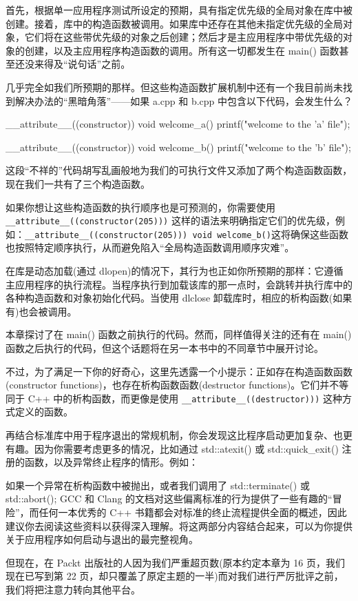 
首先，根据单一应用程序测试所设定的预期，具有指定优先级的全局对象在库中被创建。接着，库中的构造函数被调用。如果库中还存在其他未指定优先级的全局对象，它们将在这些带优先级的对象之后创建；然后才是主应用程序中带优先级的对象的创建，以及主应用程序构造函数的调用。所有这一切都发生在 main() 函数甚至还没来得及“说句话”之前。

几乎完全如我们所预期的那样。但这些构造函数扩展机制中还有一个我目前尚未找到解决办法的“黑暗角落”——如果 a.cpp 和 b.cpp 中包含以下代码，会发生什么？

\begin{cpp}
__attribute__((constructor)) void welcome_a() {
  printf("welcome to the 'a' file\n"); 
}

__attribute__((constructor)) void welcome_b() {
  printf("welcome to the 'b' file\n"); 
}
\end{cpp}

这段“不祥的”代码胡写乱画般地为我们的可执行文件又添加了两个构造函数函数，现在我们一共有了三个构造函数。

如果你想让这些构造函数的执行顺序也是可预测的，你需要使用 \verb|__attribute__((constructor(205)))| 这样的语法来明确指定它们的优先级，例如：\verb|__attribute__((constructor(205))) void welcome_b()|这将确保这些函数也按照特定顺序执行，从而避免陷入“全局构造函数调用顺序灾难”。

在库是动态加载(通过 dlopen)的情况下，其行为也正如你所预期的那样：它遵循主应用程序的执行流程。当程序执行到加载该库的那一点时，会跳转并执行库中的各种构造函数和对象初始化代码。当使用 dlclose 卸载库时，相应的析构函数(如果有)也会被调用。


本章探讨了在 main() 函数之前执行的代码。然而，同样值得关注的还有在 main() 函数之后执行的代码，但这个话题将在另一本书中的不同章节中展开讨论。

不过，为了满足一下你的好奇心，这里先透露一个小提示：正如存在构造函数函数(constructor functions)，也存在析构函数函数(destructor functions)。它们并不等同于 C++ 中的析构函数，而更像是使用 \verb|__attribute__((destructor)))| 这种方式定义的函数。

再结合标准库中用于程序退出的常规机制，你会发现这比程序启动更加复杂、也更有趣。因为你需要考虑更多的情况，比如通过 std::atexit() 或 std::quick\_exit() 注册的函数，以及异常终止程序的情形。例如：

如果一个异常在析构函数中被抛出，或者我们调用了 std::terminate() 或 std::abort(); GCC 和 Clang 的文档对这些偏离标准的行为提供了一些有趣的“冒险”，而任何一本优秀的 C++ 书籍都会对标准的终止流程提供全面的概述，因此建议你去阅读这些资料以获得深入理解。将这两部分内容结合起来，可以为你提供关于应用程序如何启动与退出的最完整视角。

但现在，在 Packt 出版社的人因为我们严重超页数(原本约定本章为 16 页，我们现在已写到第 22 页，却只覆盖了原定主题的一半)而对我们进行严厉批评之前，我们将把注意力转向其他平台。